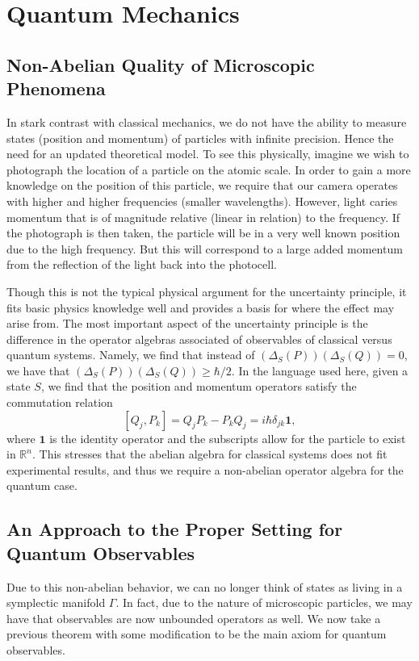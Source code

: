 \documentclass[leqno]{article}
\theoremstyle{definition}
\theoremstyle{remark}
\theoremstyle{theorem}
\newcommand{\R}{\mathbb{R}}
\begin{document}
\section{Quantum Mechanics}
\subsection{Non-Abelian Quality of Microscopic Phenomena}
In stark contrast with classical mechanics, we do not have the ability to measure states (position and momentum) of particles with infinite precision.  Hence the need for an updated theoretical model.  To see this physically, imagine we wish to photograph the location of a particle on the atomic scale.  In order to gain a more knowledge on the position of this particle, we require that our camera operates with higher and higher frequencies (smaller wavelengths).  However, light caries momentum that is of magnitude relative (linear in relation) to the frequency.  If the photograph is then taken, the particle will be in a very well known position due to the high frequency. But this will correspond to a large added momentum from the reflection of the light back into the photocell.  

Though this is not the typical physical argument for the uncertainty principle, it fits basic physics knowledge well and provides a basis for where the effect may arise from. The most important aspect of the uncertainty principle is the difference in the operator algebras associated of observables of classical versus quantum systems.  Namely, we find that instead of $(\Delta_S(P))(\Delta_S(Q))=0$, we have that $(\Delta_S(P))(\Delta_S(Q))\geq \hbar/2$.  In the language used here, given a state $S$, we find that the position and momentum operators satisfy the commutation relation
\[
[Q_j,P_k]=Q_j P_k - P_kQ_j = i\hbar \delta_{jk}\mathbf{1},
\]
where $\mathbf{1}$ is the identity operator and the subscripts allow for the particle to exist in $\R^n$. This stresses that the abelian algebra for classical systems does not fit experimental results, and thus we require a non-abelian operator algebra for the quantum case.  

\subsection{An Approach to the Proper Setting for Quantum Observables}
Due to this non-abelian behavior, we can no longer think of states as living in a symplectic manifold $\Gamma$.  In fact, due to the nature of microscopic particles, we may have that observables are now unbounded operators as well. We now take a previous theorem with some modification to be the main axiom for quantum observables.
\end{document}
